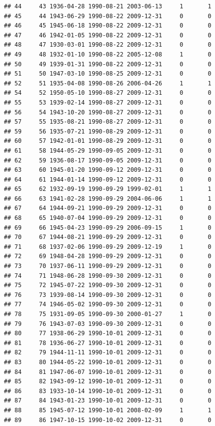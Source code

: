 \documentclass[
]{book}
\begin{document}
\begin{verbatim}
## 44     43 1936-04-28 1990-08-21 2003-06-13     1       1
## 45     44 1943-06-29 1990-08-22 2009-12-31     0       0
## 46     45 1945-06-18 1990-08-22 2009-12-31     0       0
## 47     46 1942-01-05 1990-08-22 2009-12-31     0       0
## 48     47 1930-03-01 1990-08-22 2009-12-31     0       0
## 49     48 1932-01-10 1990-08-22 2005-12-08     1       0
## 50     49 1939-01-31 1990-08-22 2009-12-31     0       0
## 51     50 1947-03-10 1990-08-25 2009-12-31     0       0
## 52     51 1935-04-08 1990-08-26 2006-04-26     1       1
## 54     52 1950-05-10 1990-08-27 2009-12-31     0       0
## 55     53 1939-02-14 1990-08-27 2009-12-31     0       0
## 56     54 1943-10-20 1990-08-27 2009-12-31     0       0
## 57     55 1935-08-21 1990-08-27 2009-12-31     0       0
## 59     56 1935-07-21 1990-08-29 2009-12-31     0       0
## 60     57 1942-01-01 1990-08-29 2009-12-31     0       0
## 61     58 1944-05-29 1990-09-05 2009-12-31     0       0
## 62     59 1936-08-17 1990-09-05 2009-12-31     0       0
## 63     60 1945-01-20 1990-09-12 2009-12-31     0       0
## 64     61 1944-01-14 1990-09-12 2009-12-31     0       0
## 65     62 1932-09-19 1990-09-29 1999-02-01     1       1
## 66     63 1941-02-28 1990-09-29 2004-06-06     1       1
## 67     64 1944-09-21 1990-09-29 2009-12-31     0       0
## 68     65 1940-07-04 1990-09-29 2009-12-31     0       0
## 69     66 1945-04-23 1990-09-29 2006-09-15     1       0
## 70     67 1944-08-21 1990-09-29 2009-12-31     0       0
## 71     68 1937-02-06 1990-09-29 2009-12-19     1       0
## 72     69 1948-04-28 1990-09-29 2009-12-31     0       0
## 73     70 1937-06-11 1990-09-29 2009-12-31     0       0
## 74     71 1948-06-28 1990-09-30 2009-12-31     0       0
## 75     72 1945-07-22 1990-09-30 2009-12-31     0       0
## 76     73 1939-08-14 1990-09-30 2009-12-31     0       0
## 77     74 1946-05-02 1990-09-30 2009-12-31     0       0
## 78     75 1931-09-05 1990-09-30 2000-01-27     1       0
## 79     76 1943-07-03 1990-09-30 2009-12-31     0       0
## 80     77 1938-06-29 1990-10-01 2009-12-31     0       0
## 81     78 1936-06-27 1990-10-01 2009-12-31     0       0
## 82     79 1944-11-11 1990-10-01 2009-12-31     0       0
## 83     80 1944-05-22 1990-10-01 2009-12-31     0       0
## 84     81 1947-06-07 1990-10-01 2009-12-31     0       0
## 85     82 1943-09-12 1990-10-01 2009-12-31     0       0
## 86     83 1933-10-14 1990-10-01 2009-12-31     0       0
## 87     84 1943-01-23 1990-10-01 2009-12-31     0       0
## 88     85 1945-07-12 1990-10-01 2008-02-09     1       1
## 89     86 1947-10-15 1990-10-02 2009-12-31     0       0

\end{verbatim}
\end{document}
